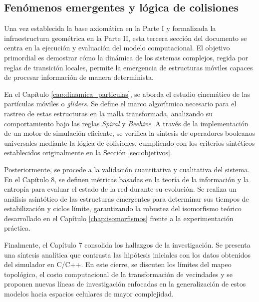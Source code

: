 % 
%
%

\begin{partbacktext}
\part{Fenómenos emergentes y lógica de colisiones}

\noindent Una vez establecida la base axiomática en la Parte I y formalizada la infraestructura geométrica en la Parte II, esta tercera sección del documento se centra en la ejecución y evaluación del modelo computacional. El objetivo primordial es demostrar cómo la dinámica de los sistemas complejos, regida por reglas de transición locales, permite la emergencia de estructuras móviles capaces de procesar información de manera determinista.

En el Capítulo \ref{cap:dinamica_particulas}, se aborda el estudio cinemático de las partículas móviles o \textit{gliders}. Se define el marco algorítmico necesario para el rastreo de estas estructuras en la malla transformada, analizando su comportamiento bajo las reglas \textit{Spiral} y \textit{Beehive}. A través de la implementación de un motor de simulación eficiente, se verifica la síntesis de operadores booleanos universales mediante la lógica de colisiones, cumpliendo con los criterios sintéticos establecidos originalmente en la Sección \ref{sec:objetivos}.

Posteriormente, se procede a la validación cuantitativa y cualitativa del sistema. En el Capítulo 8, se definen métricas basadas en la teoría de la información y la entropía para evaluar el estado de la red durante su evolución. Se realiza un análisis asintótico de las estructuras emergentes para determinar sus tiempos de estabilización y ciclos límite, garantizando la robustez del isomorfismo teórico desarrollado en el Capítulo \ref{chap:isomorfismos} frente a la experimentación práctica.

Finalmente, el Capítulo 7 consolida los hallazgos de la investigación. Se presenta una síntesis analítica que contrasta las hipótesis iniciales con los datos obtenidos del simulador en C/C++. En este cierre, se discuten los límites del mapeo topológico, el costo computacional de la transformación de vecindades y se proponen nuevas líneas de investigación enfocadas en la generalización de estos modelos hacia espacios celulares de mayor complejidad.

\end{partbacktext}